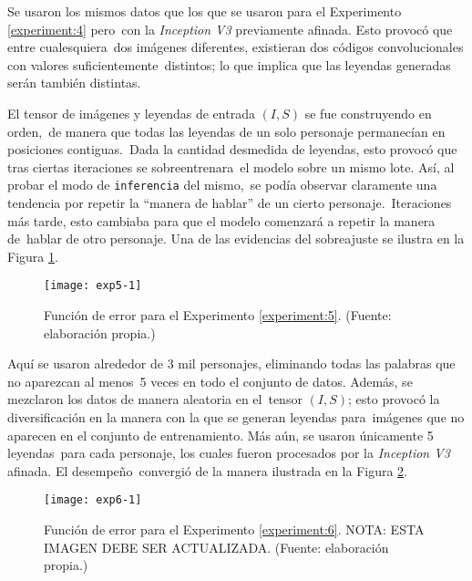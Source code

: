 \begin{experiment} \label{experiment:5}
  Se usaron los mismos datos que los que se usaron para el Experimento \ref{experiment:4} pero\
  con la \emph{Inception V3} previamente afinada. Esto provocó que entre cualesquiera\
  dos imágenes diferentes, existieran dos códigos convolucionales con valores suficientemente\
  distintos; lo que implica que las leyendas generadas serán también distintas.\par
  El tensor de imágenes y leyendas de entrada $(I, S)$ se fue construyendo en orden,\
  de manera que todas las leyendas de un solo personaje permanecían en posiciones contiguas.\
  Dada la cantidad desmedida de leyendas, esto provocó que tras ciertas iteraciones se sobreentrenara\
  el modelo sobre un mismo lote. Así, al probar el modo de \verb+inferencia+ del mismo,\
  se podía observar claramente una tendencia por repetir la ``manera de hablar'' de un cierto personaje.\
  Iteraciones más tarde, esto cambiaba para que el modelo comenzará a repetir la manera de\
  hablar de otro personaje. Una de las evidencias del sobreajuste se ilustra en la Figura \ref{exp5}.
\end{experiment}

\begin{figure}[h]
  \texttt{[image: exp5-1]}
  \caption{
    Función de error para el Experimento \ref{experiment:5}.
    (Fuente: elaboración propia.)
  }
  \label{exp5}
\end{figure}

\begin{experiment} \label{experiment:6}
  Aquí se usaron alrededor de 3 mil personajes, eliminando todas las palabras que no aparezcan al menos\
  5 veces en todo el conjunto de datos. Además, se mezclaron los datos de manera aleatoria en el\
  tensor $(I, S)$; esto provocó la diversificación en la manera con la que se generan leyendas para\
  imágenes que no aparecen en el conjunto de entrenamiento. Más aún, se usaron únicamente 5 leyendas\
  para cada personaje, los cuales fueron procesados por la \emph{Inception V3} afinada. El desempeño\
  convergió de la manera ilustrada en la Figura \ref{exp6}.
\end{experiment}

\begin{figure}[H]
  \texttt{[image: exp6-1]}
  \caption{
    Función de error para el Experimento \ref{experiment:6}.
    NOTA: ESTA IMAGEN DEBE SER ACTUALIZADA.
    (Fuente: elaboración propia.)
  }
  \label{exp6}
\end{figure}


